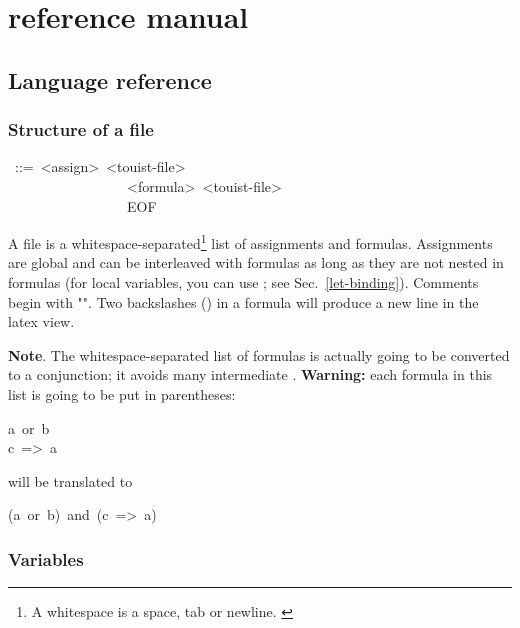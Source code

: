 \chapter{\touist reference manual}\label{sec-language-reference}%

\section{Language reference}

\subsection{Structure of a \touist file}\label{sec-structure-of-a-touist-file}%
\begin{mdpre}%
~::=~{\textless{}assign\textgreater{}}~{\textless{}touist-file\textgreater{}}\\
~~~~~~~~~~~~~~~~\textbar{}~{\textless{}formula\textgreater{}}~{\textless{}touist-file\textgreater{}}\\
~~~~~~~~~~~~~~~~\textbar{}~EOF%
\end{mdpre}\noindent A \touist file is a whitespace-separated\footnote{\noindent A whitespace is a space, tab or newline.%
\label{fn-whitespace}%
} list of
assignments and formulas. Assignments are global and can be interleaved
with formulas as long as they are not nested in formulas (for local
variables, you can use ; see Sec.~\ref{let-binding}). Comments begin
with "". Two backslashes (\mdcode{\textbackslash{}\textbackslash{}}) in a formula will produce a new
line in the latex view.

\noindent\textbf{Note}.
The whitespace-separated list of formulas is actually going to be
converted to a conjunction; it avoids many intermediate .
\textbf{Warning:} each formula in this list is going to be put in
parentheses:%
\begin{mdpre}%
\noindent a~or~b\\
c~=\textgreater{}~a%
\end{mdpre}\noindent will be translated to
\begin{mdpre}%
\noindent(a~or~b)~and~(c~=\textgreater{}~a)%
\end{mdpre}\label{newline-and-note}%

\subsection{Variables}\label{sec-variables}%

